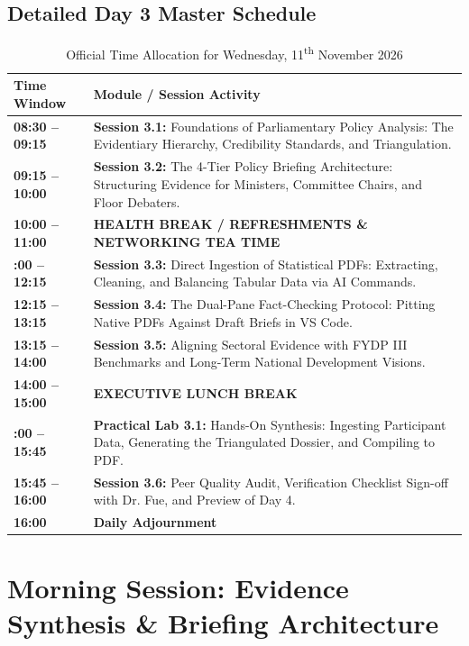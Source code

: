 \documentclass[11pt, a4paper]{report}
\begin{document}
\section{Detailed Day 3 Master Schedule}
\begin{table}[htbp]
\centering
\caption{Official Time Allocation for Wednesday, 11\textsuperscript{th} November 2026}
\vspace{0.2cm}
\begin{tabular}{@{}>{\bfseries}lp{11.5cm}@{}}
\toprule
Time Window & Module / Session Activity \\
\midrule
08:30 -- 09:15 & \textbf{Session 3.1:} Foundations of Parliamentary Policy Analysis: The Evidentiary Hierarchy, Credibility Standards, and Triangulation. \\
09:15 -- 10:00 & \textbf{Session 3.2:} The 4-Tier Policy Briefing Architecture: Structuring Evidence for Ministers, Committee Chairs, and Floor Debaters. \\
\addlinespace
\textbf{10:00 -- 11:00} & \textbf{HEALTH BREAK / REFRESHMENTS \& NETWORKING TEA TIME} \\
\addlinespace
11:00 -- 12:15 & \textbf{Session 3.3:} Direct Ingestion of Statistical PDFs: Extracting, Cleaning, and Balancing Tabular Data via AI Commands. \\
12:15 -- 13:15 & \textbf{Session 3.4:} The Dual-Pane Fact-Checking Protocol: Pitting Native PDFs Against Draft Briefs in VS Code. \\
13:15 -- 14:00 & \textbf{Session 3.5:} Aligning Sectoral Evidence with FYDP III Benchmarks and Long-Term National Development Visions. \\
\addlinespace
\textbf{14:00 -- 15:00} & \textbf{EXECUTIVE LUNCH BREAK} \\
\addlinespace
15:00 -- 15:45 & \textbf{Practical Lab 3.1:} Hands-On Synthesis: Ingesting Participant Data, Generating the Triangulated Dossier, and Compiling to PDF. \\
15:45 -- 16:00 & \textbf{Session 3.6:} Peer Quality Audit, Verification Checklist Sign-off with Dr. Fue, and Preview of Day 4. \\
\textbf{16:00} & \textbf{Daily Adjournment} \\
\bottomrule
\end{tabular}
\end{table}

\newpage

\chapter{Morning Session: Evidence Synthesis \& Briefing Architecture}
\end{document}
